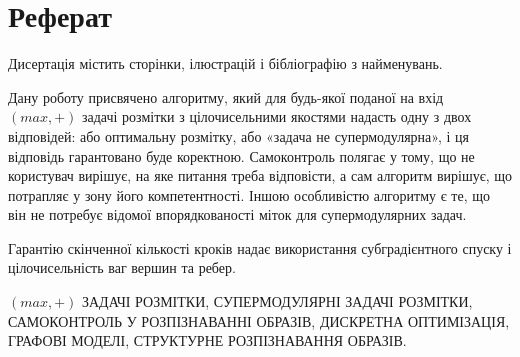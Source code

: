 \chapter*{Реферат}

Дисертація містить 
сторінки,
ілюстрацій
і бібліографію з 
найменувань.

Дану роботу присвячено алгоритму, який для будь-якої
поданої на вхід \((max,+)\) задачі розмітки з цілочисельними
якостями надасть одну з двох відповідей: або оптимальну
розмітку, або «задача не супермодулярна», і ця
відповідь гарантовано буде коректною.
Самоконтроль полягає у тому, що не користувач вирішує, 
на яке питання треба відповісти, а сам алгоритм вирішує, 
що потрапляє у зону його компетентності. Іншою
особливістю алгоритму є те, що він не потребує відомої 
впорядкованості міток для супермодулярних задач.

Гарантію скінченної кількості кроків надає використання
субградієнтного спуску і цілочисельність ваг вершин та ребер.

\MakeUppercase{\((max,+)\) задачі розмітки,
супермодулярні задачі розмітки,\\
самоконтроль у розпізнаванні образів, 
дискретна оптимізація, графові моделі,
структурне розпізнавання образів.}
